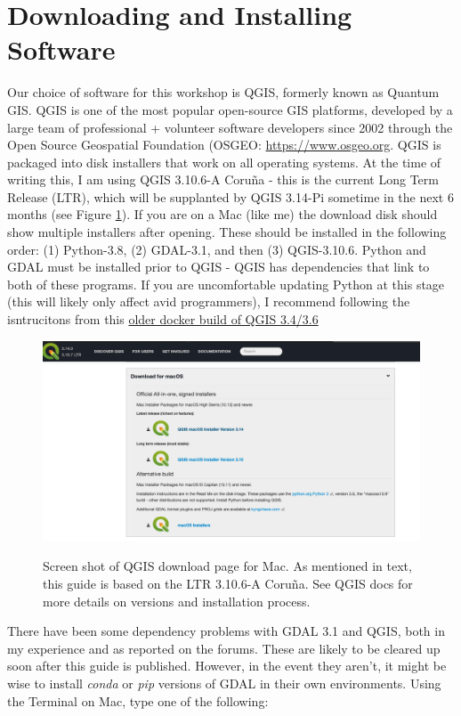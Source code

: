 \documentclass{article}
\begin{document}
\section{Downloading and Installing Software}

Our choice of software for this workshop is QGIS, formerly known as Quantum GIS. QGIS is one of the most popular open-source GIS platforms, developed by a large team of professional + volunteer software developers since 2002 through the Open Source Geospatial Foundation (OSGEO: \href{https://www.osgeo.org}{https://www.osgeo.org}. QGIS is packaged into disk installers that work on all operating systems. At the time of writing this, I am using QGIS 3.10.6-A Coru\~na - this is the current Long Term Release (LTR), which will be supplanted by QGIS 3.14-Pi sometime in the next 6 months (see Figure \ref{fig:fig2}). If you are on a Mac (like me) the download disk should show multiple installers after opening. These should be installed in the following order: (1) Python-3.8, (2) GDAL-3.1, and then (3) QGIS-3.10.6. Python and GDAL must be installed prior to QGIS - QGIS has dependencies that link to both of these programs. If you are uncomfortable updating Python at this stage (this will likely only affect avid programmers), I recommend following the isntrucitons from this \href{https://github.com/rafdouglas/qgis_desktop_docker}{older docker build of QGIS 3.4/3.6}

\begin{figure}[htbp]
    \centering
    \includegraphics[width=\textwidth]{Figure2_Downloads.png}
    \label{fig:fig2}
    \caption{Screen shot of QGIS download page for Mac. As mentioned in text, this guide is based on the LTR 3.10.6-A Coru\~na. See QGIS docs for more details on versions and installation process.}
\end{figure}

There have been some dependency problems with GDAL 3.1 and QGIS, both in my experience and as reported on the forums. These are likely to be cleared up soon after this guide is published. However, in the event they aren't, it might be wise to install \textit{conda} or \textit{pip} versions of GDAL in their own environments. Using the Terminal on Mac, type one of the following:
\end{document}
